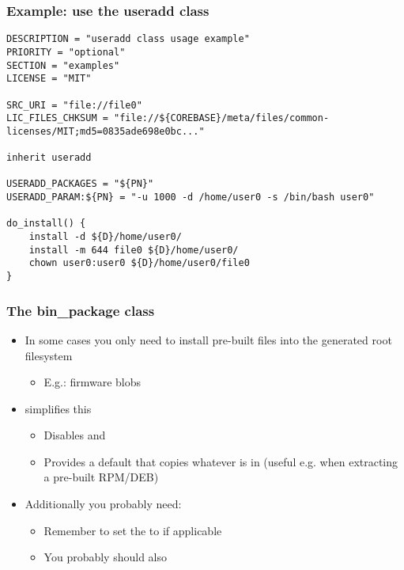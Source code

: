 \begin{frame}[fragile]
  \frametitle{Example: use the useradd class}
  \begin{block}{}
    \begin{verbatim}
DESCRIPTION = "useradd class usage example"
PRIORITY = "optional"
SECTION = "examples"
LICENSE = "MIT"

SRC_URI = "file://file0"
LIC_FILES_CHKSUM = "file://${COREBASE}/meta/files/common-licenses/MIT;md5=0835ade698e0bc..."

inherit useradd

USERADD_PACKAGES = "${PN}"
USERADD_PARAM:${PN} = "-u 1000 -d /home/user0 -s /bin/bash user0"

do_install() {
    install -d ${D}/home/user0/
    install -m 644 file0 ${D}/home/user0/
    chown user0:user0 ${D}/home/user0/file0
}
    \end{verbatim}
  \end{block}
\end{frame}

\begin{frame}
  \frametitle{The bin\_package class}
  \begin{itemize}
    \item In some cases you only need to install pre-built files into the
      generated root filesystem
      \begin{itemize}
        \item E.g.: firmware blobs
      \end{itemize}
    \item {} simplifies this
      \begin{itemize}
        \item Disables  and 
        \item Provides a default  that copies whatever is
          in  (useful e.g. when extracting a pre-built RPM/DEB)
      \end{itemize}
    \item Additionally you probably need:
      \begin{itemize}
        \item Remember to set the  to  if applicable
        \item You probably should also 
      \end{itemize}
  \end{itemize}
\end{frame}

